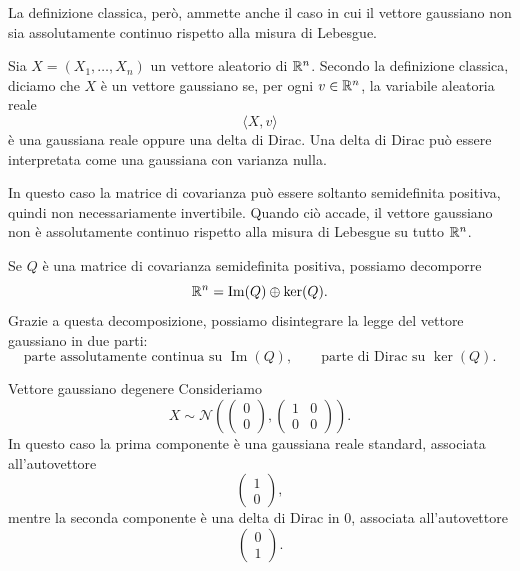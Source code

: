 \documentclass[a4paper]{article}
\begin{document}
La definizione classica, però, ammette anche il caso in cui il vettore gaussiano non sia assolutamente continuo rispetto alla misura di Lebesgue.

Sia \(X=(X_1,\ldots,X_n)\) un vettore aleatorio di \(\mathbb{R}^n\).
Secondo la definizione classica, diciamo che \(X\) è un vettore gaussiano se, per ogni \(v\in\mathbb{R}^n\), la variabile aleatoria reale
\[
    \langle X,v\rangle
\]
è una gaussiana reale oppure una delta di Dirac. Una delta di Dirac può essere interpretata come una gaussiana con varianza nulla.

In questo caso la matrice di covarianza può essere soltanto semidefinita positiva, quindi non necessariamente invertibile. Quando ciò accade, il vettore gaussiano non è assolutamente continuo rispetto alla misura di Lebesgue su tutto \(\mathbb{R}^n\).

Se \(Q\) è una matrice di covarianza semidefinita positiva, possiamo decomporre
\[
    \mathbb{R}^n
    =
    \operatorname{Im}(Q)\oplus\ker(Q).
\]
Grazie a questa decomposizione, possiamo disintegrare la legge del vettore gaussiano in due parti:
\[
    \text{parte assolutamente continua su }\operatorname{Im}(Q),
    \qquad
    \text{parte di Dirac su }\ker(Q).
\]

\begin{snippetexample}{Vettore gaussiano degenere}
    Consideriamo
    \[
        X\sim\mathcal N
        \left(
            \begin{pmatrix}
                0\\
                0
            \end{pmatrix},
            \begin{pmatrix}
                1 & 0\\
                0 & 0
            \end{pmatrix}
        \right).
    \]
    In questo caso la prima componente è una gaussiana reale standard, associata all'autovettore
    \[
        \begin{pmatrix}
            1\\
            0
        \end{pmatrix},
    \]
    mentre la seconda componente è una delta di Dirac in \(0\), associata all'autovettore
    \[
        \begin{pmatrix}
            0\\
            1
        \end{pmatrix}.
    \]
\end{snippetexample}
\end{document}

